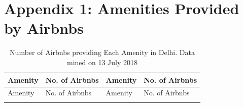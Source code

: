 \documentclass[a4paper, 12pt]{article}
\begin{document}
  \section*{Appendix 1: Amenities Provided by Airbnbs}
\small
\centering
\begin{longtable}[c]{>{\raggedright}p{5.5cm}>{\raggedright}p{2cm}p{5.5cm}>{\raggedright\arraybackslash}p{2cm}}
\caption{Number of Airbnbs providing Each Amenity in Delhi. Data mined on 13 July 2018} \\
\toprule
Amenity & No. of Airbnbs & Amenity & No. of Airbnbs \\
\midrule
\endfirsthead
\toprule
Amenity & No. of Airbnbs & Amenity & No. of Airbnbs \\
\midrule
\endhead
\endfoot
\endlastfoot


\end{longtable}
\end{document}
